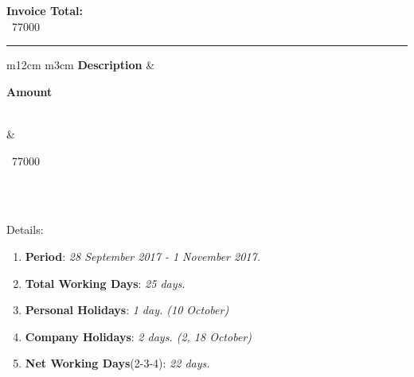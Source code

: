 \documentclass[]{invoice-style}
\begin{document}
\begin{minipage}[t][60em][c]{\textwidth}
\begin{minipage}[][17em][c]{\textwidth}
\hfill
\begin{minipage}[][13em][c]{.22\textwidth}
\begin{flushright}
        {\Large \bfseries Invoice Total:}\vspace{.5cm}\\
        {\Huge\rupee~77000}
        \end{flushright}
\end{minipage}
\end{minipage}
\hrule
	\begin{minipage}[][][t]{\textwidth}
\begin{tabular}{  m{12cm}  m{3cm}  } 
{\bfseries \Large Description} & \begin{center}{\bfseries \Large Amount}\end{center}  \\ 
 & \begin{center}{\large\rupee~77000}\end{center} \\ 
\end{tabular}
\vspace{.35cm}\\
\hspace*{3mm}Details:
\begin{enumerate}[topsep=0pt]\setlength{\itemsep}{0pt}
    \setlength{\parskip}{0pt}
    \setlength{\parsep}{0pt}
\item {\bfseries Period}: {\itshape 28 September 2017 - 1 November 2017.}
\item {\bfseries Total Working Days}: {\itshape 25 days.}
\item {\bfseries Personal Holidays}: {\itshape 1 day. (10 October)}
\item {\bfseries Company Holidays}: {\itshape 2 days. (2, 18 October)}
\item {\bfseries Net Working Days}(2-3-4): {\itshape 22 days.}
\end{enumerate}
	\end{minipage}
		\vspace*{.25em}\\


\end{minipage}
\end{document}
